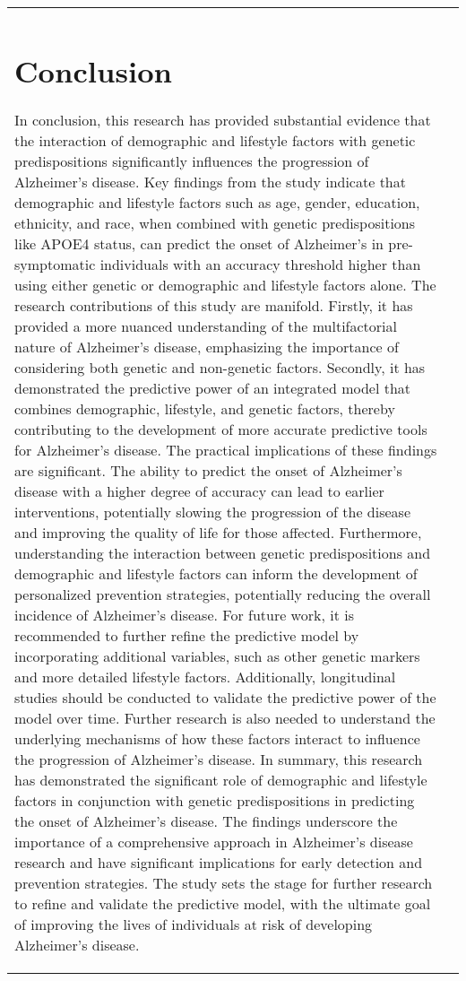 \documentclass[conference]{IEEEtran}
\begin{document}
\begin{table}[htbp]
\begin{tabular}{|l|c|}
\section{Conclusion}
In conclusion, this research has provided substantial evidence that the interaction of demographic and lifestyle factors with genetic predispositions significantly influences the progression of Alzheimer's disease. Key findings from the study indicate that demographic and lifestyle factors such as age, gender, education, ethnicity, and race, when combined with genetic predispositions like APOE4 status, can predict the onset of Alzheimer's in pre-symptomatic individuals with an accuracy threshold higher than using either genetic or demographic and lifestyle factors alone. The research contributions of this study are manifold. Firstly, it has provided a more nuanced understanding of the multifactorial nature of Alzheimer's disease, emphasizing the importance of considering both genetic and non-genetic factors. Secondly, it has demonstrated the predictive power of an integrated model that combines demographic, lifestyle, and genetic factors, thereby contributing to the development of more accurate predictive tools for Alzheimer's disease. The practical implications of these findings are significant. The ability to predict the onset of Alzheimer's disease with a higher degree of accuracy can lead to earlier interventions, potentially slowing the progression of the disease and improving the quality of life for those affected. Furthermore, understanding the interaction between genetic predispositions and demographic and lifestyle factors can inform the development of personalized prevention strategies, potentially reducing the overall incidence of Alzheimer's disease. For future work, it is recommended to further refine the predictive model by incorporating additional variables, such as other genetic markers and more detailed lifestyle factors. Additionally, longitudinal studies should be conducted to validate the predictive power of the model over time. Further research is also needed to understand the underlying mechanisms of how these factors interact to influence the progression of Alzheimer's disease. In summary, this research has demonstrated the significant role of demographic and lifestyle factors in conjunction with genetic predispositions in predicting the onset of Alzheimer's disease. The findings underscore the importance of a comprehensive approach in Alzheimer's disease research and have significant implications for early detection and prevention strategies. The study sets the stage for further research to refine and validate the predictive model, with the ultimate goal of improving the lives of individuals at risk of developing Alzheimer's disease.


\end{tabular}
\end{table}
\end{document}
